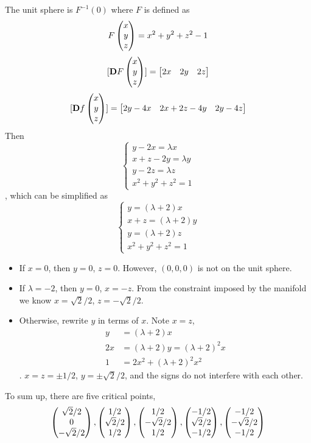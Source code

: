 \documentclass{homework}
\begin{document}
\begin{problem}{5}
The unit sphere is $F^{-1}(0)$ where $F$ is defined as
$$F\begin{pmatrix}x\\y\\z\end{pmatrix} = x^2+y^2+z^2-1$$
$$[\mathbf{D}F\begin{pmatrix}x\\y\\z\end{pmatrix}] = \begin{bmatrix}2x&2y&2z\end{bmatrix}$$
$$[\mathbf{D}f\begin{pmatrix}x\\y\\z\end{pmatrix}] = \begin{bmatrix}2y-4x&2x+2z-4y&2y-4z\end{bmatrix}$$
Then
$$\left\{
\begin{aligned}
y-2x=\lambda x\\
x+z-2y=\lambda y\\
y-2z=\lambda z\\
x^2+y^2+z^2=1
\end{aligned}
\right.$$
, which can be simplified as
$$\left\{
\begin{aligned}
y = (\lambda + 2)x\\
x+z = (\lambda + 2)y\\
y = (\lambda + 2)z\\
x^2+y^2+z^2=1
\end{aligned}
\right.$$

\begin{itemize}
\item If $x = 0$, then $y = 0$, $z = 0$. However, $(0, 0, 0)$ is not on the unit
sphere.
\item If $\lambda = - 2$, then $y = 0$, $x = -z$. From the constraint imposed
by the manifold we know $x = \sqrt{2}/2$, $z = -\sqrt{2}/2$.
\item Otherwise, rewrite $y$ in terms of $x$. Note $x = z$,
\begin{align*}
y &= (\lambda + 2)x \\
2x &= (\lambda + 2)y = (\lambda + 2)^2 x \\
1 &= 2x^2 + (\lambda + 2)^2x^2
\end{align*}
. $x = z = \pm 1/2$, $y = \pm \sqrt{2}/2$, and the signs do not interfere with
each other.
\end{itemize}
To sum up, there are five critical points,
$$
\begin{pmatrix}{\sqrt{2}}/{2} \\ 0 \\ -{\sqrt{2}}/{2}\end{pmatrix},
\begin{pmatrix}{1}/{2} \\ {\sqrt{2}}/{2} \\ {1}/{2}\end{pmatrix},
\begin{pmatrix}{1}/{2} \\ -{\sqrt{2}}/{2} \\ {1}/{2}\end{pmatrix},
\begin{pmatrix}-{1}/{2} \\ {\sqrt{2}}/{2} \\ -{1}/{2}\end{pmatrix},
\begin{pmatrix}-{1}/{2} \\ -{\sqrt{2}}/{2} \\ -{1}/{2}\end{pmatrix}$$
\end{problem}
\end{document}
